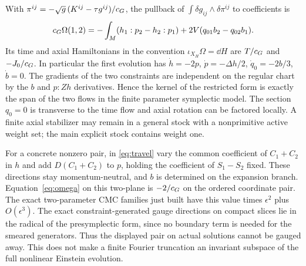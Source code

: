 With
\(\pi^{ij}=-\sqrt g\,(K^{ij}-\tau g^{ij})/c_G\),
the pullback of \(\int\delta g_{ij}\wedge\delta\pi^{ij}\) to coefficients is
\begin{equation}\label{eq:omega}
 c_G\Omega(1,2)=-\int_M(h_1:p_2-h_2:p_1)+
                  2V(q_{01}b_2-q_{02}b_1).
\end{equation}
Its time and axial Hamiltonians in the convention \(\iota_{X_H}\Omega=\dd H\) are \(T/c_G\) and \(-J_0/c_G\). In particular the first evolution has
\(\dot h=-2p\), \(\dot p=-\Delta h/2\), \(\dot q_0=-2b/3\), \(\dot b=0\).
The gradients of the two constraints are independent on the regular chart by the \(b\) and \(p:Zh\) derivatives. Hence the kernel of the restricted form is exactly the span of the two flows in the finite parameter symplectic model. The section \(q_0=0\) is transverse to the time flow and axial rotation can be factored locally. A finite axial stabilizer may remain in a general stock with a nonprimitive active weight set; the main explicit stock contains weight one.

For a concrete nonzero pair, in \eqref{eq:travel} vary the common coefficient of \(C_1+C_2\) in \(h\) and add \(D(C_1+C_2)\) to \(p\), holding the coefficient of \(S_1-S_2\) fixed. These directions stay momentum-neutral, and \(b\) is determined on the expansion branch. Equation~\eqref{eq:omega} on this two-plane is \(-2/c_G\) on the ordered coordinate pair. The exact two-parameter CMC families just built have this value times \(\epsilon^2\) plus \(O(\epsilon^3)\). The exact constraint-generated gauge directions on compact slices lie in the radical of the presymplectic form, since no boundary term is needed for the smeared generators. Thus the displayed pair on actual solutions cannot be gauged away. This does not make a finite Fourier truncation an invariant subspace of the full nonlinear Einstein evolution.

